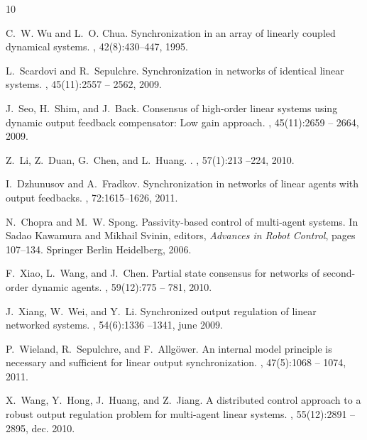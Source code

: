 \documentclass[onecolumn,a4paper,12pt]{article}
\numberwithin{equation}{section}
\begin{document}
%
\begin{thebibliography}{10}

C.~W. Wu and L.~O. Chua.
\newblock Synchronization in an array of linearly coupled dynamical systems.
, 42(8):430--447, 1995.

L.~Scardovi and R.~Sepulchre.
\newblock Synchronization in networks of identical linear systems.
, 45(11):2557 -- 2562, 2009.

J.~Seo, H.~Shim, and J.~Back.
\newblock Consensus of high-order linear systems using dynamic output feedback
  compensator: Low gain approach.
, 45(11):2659 -- 2664, 2009.

Z.~Li, Z.~Duan, G.~Chen, and L.~Huang.
.
,
  57(1):213 --224, 2010.

I.~Dzhunusov and A.~Fradkov.
\newblock Synchronization in networks of linear agents with output feedbacks.
, 72:1615--1626, 2011.

N.~Chopra and M.~W. Spong.
\newblock Passivity-based control of multi-agent systems.
\newblock In Sadao Kawamura and Mikhail Svinin, editors, {\em Advances in Robot
  Control}, pages 107--134. Springer Berlin Heidelberg, 2006.

F.~Xiao, L.~Wang, and J.~Chen.
\newblock Partial state consensus for networks of second-order dynamic agents.
, 59(12):775 -- 781, 2010.

J.~Xiang, W.~Wei, and Y.~Li.
\newblock Synchronized output regulation of linear networked systems.
, 54(6):1336 --1341, june
  2009.

P.~Wieland, R.~Sepulchre, and F.~Allg\"{o}wer.
\newblock An internal model principle is necessary and sufficient for linear
  output synchronization.
, 47(5):1068 -- 1074, 2011.

X.~Wang, Y.~Hong, J.~Huang, and Z.~Jiang.
\newblock A distributed control approach to a robust output regulation problem
  for multi-agent linear systems.
, 55(12):2891 --2895, dec. 2010.


\end{thebibliography}
\end{document}
